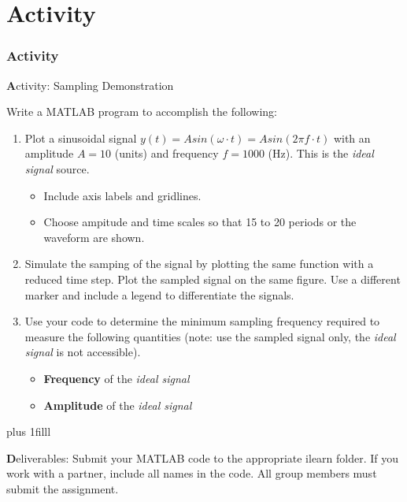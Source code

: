 \documentclass[fleqn]{beamer} %
\newcommand{\sectiontitleV}{Activity}
\newcommand{\btVFill}{\vskip0pt plus 1filll}
\begin{document}
\section{\sectiontitleV}
\begin{frame}[label=sectionV] \scriptsize
\frametitle{\sectiontitleV}
\bigskip

{\textbf Activity: Sampling Demonstration}

Write a MATLAB program to accomplish the following:

\begin{enumerate} \tiny

	\item Plot a sinusoidal signal $y(t)=Asin(\omega\cdot t)=Asin(2\pi f \cdot t)$ with an amplitude $A=10$ (units) and frequency $f=1000$ (Hz). This is the {\it ideal signal} source. 
	\begin{itemize} \tiny
		\item Include axis labels and gridlines. 
		\item Choose ampitude and time scales so that 15 to 20 periods or the waveform are shown. \vspace{5mm}\\
	\end{itemize} 
	\item Simulate the samping of the signal by plotting the same function with a reduced time step. Plot the sampled signal on the same figure. Use a different marker and include a legend to differentiate the signals. \vspace{5mm}\\ 

	\item Use your code to determine the minimum sampling frequency required to measure the following quantities (note: use the sampled signal only, the {\it ideal signal} is not accessible).	

	\begin{itemize} \tiny
		\item {\bf Frequency} of the {\it ideal signal}
		\item {\bf Amplitude} of the {\it ideal signal}
	\end{itemize}



\end{enumerate}

\btVFill

\tiny
{\textbf Deliverables: Submit your MATLAB code to the appropriate ilearn folder. If you work with a partner, include all names in the code. All group members must submit the assignment.}




\end{frame}
\end{document}
